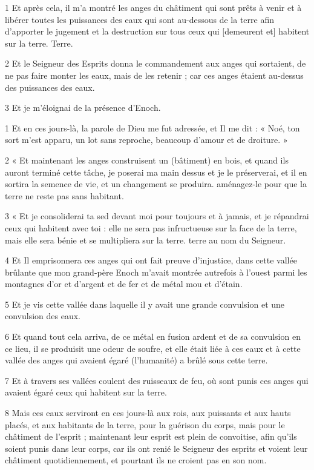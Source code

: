 
\par 1 Et après cela, il m'a montré les anges du châtiment qui sont prêts à venir et à libérer toutes les puissances des eaux qui sont au-dessous de la terre afin d'apporter le jugement et la destruction sur tous ceux qui [demeurent et] habitent sur la terre. Terre.
\par 2 Et le Seigneur des Esprits donna le commandement aux anges qui sortaient, de ne pas faire monter les eaux, mais de les retenir ; car ces anges étaient au-dessus des puissances des eaux.
\par 3 Et je m'éloignai de la présence d'Enoch.


\par 1 Et en ces jours-là, la parole de Dieu me fut adressée, et Il me dit : « Noé, ton sort m'est apparu, un lot sans reproche, beaucoup d'amour et de droiture. »
\par 2 « Et maintenant les anges construisent un (bâtiment) en bois, et quand ils auront terminé cette tâche, je poserai ma main dessus et je le préserverai, et il en sortira la semence de vie, et un changement se produira. aménagez-le pour que la terre ne reste pas sans habitant.
\par 3 « Et je consoliderai ta sed devant moi pour toujours et à jamais, et je répandrai ceux qui habitent avec toi : elle ne sera pas infructueuse sur la face de la terre, mais elle sera bénie et se multipliera sur la terre. terre au nom du Seigneur.
\par 4 Et Il emprisonnera ces anges qui ont fait preuve d'injustice, dans cette vallée brûlante que mon grand-père Enoch m'avait montrée autrefois à l'ouest parmi les montagnes d'or et d'argent et de fer et de métal mou et d'étain.
\par 5 Et je vis cette vallée dans laquelle il y avait une grande convulsion et une convulsion des eaux.
\par 6 Et quand tout cela arriva, de ce métal en fusion ardent et de sa convulsion en ce lieu, il se produisit une odeur de soufre, et elle était liée à ces eaux et à cette vallée des anges qui avaient égaré (l’humanité) a brûlé sous cette terre.
\par 7 Et à travers ses vallées coulent des ruisseaux de feu, où sont punis ces anges qui avaient égaré ceux qui habitent sur la terre.
\par 8 Mais ces eaux serviront en ces jours-là aux rois, aux puissants et aux hauts placés, et aux habitants de la terre, pour la guérison du corps, mais pour le châtiment de l'esprit ; maintenant leur esprit est plein de convoitise, afin qu'ils soient punis dans leur corps, car ils ont renié le Seigneur des esprits et voient leur châtiment quotidiennement, et pourtant ils ne croient pas en son nom.
